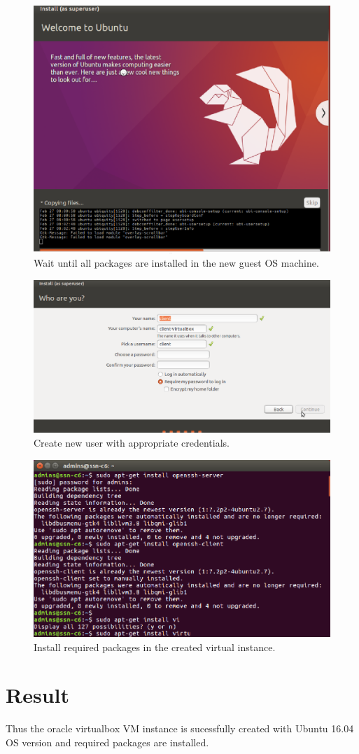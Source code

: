 \documentclass[a4paper,10pt]{article}
\begin{document}
\begin{figure}[h]
	\includegraphics[scale=0.25,center]{fig6.png}
	\caption{Wait until all packages are installed in the new guest OS machine.}
	\label{fig:6}
\end{figure}

\newpage
\begin{figure}[h]
	\includegraphics[scale=0.28,center]{fig7.png}
	\caption{Create new user with appropriate credentials.}
	\label{fig:7}
\end{figure}

	\begin{figure}[h]
		\includegraphics[scale=0.28,center]{fig8.png}
		\caption{Install required packages in the created virtual instance.}
		\label{fig:8}
	\end{figure}

\section{Result}
Thus the oracle virtualbox VM instance is sucessfully created with Ubuntu 16.04 OS version and required packages are installed.
\end{document}
